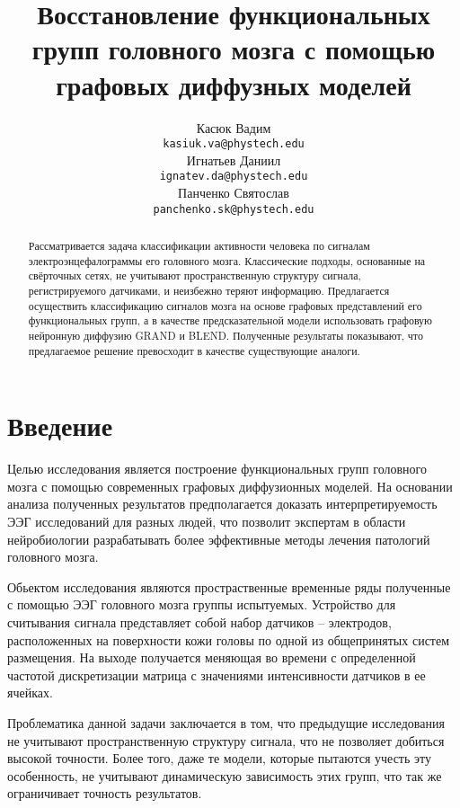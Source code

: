 \documentclass{article}
\title{Восстановление функциональных групп головного мозга с помощью графовых диффузных моделей}
\author{
	Касюк Вадим \\
	\texttt{kasiuk.va@phystech.edu} \\
	\And
	Игнатьев Даниил \\
	\texttt{ignatev.da@phystech.edu} \\
	\And
	Панченко Святослав \\
	\texttt{panchenko.sk@phystech.edu}
}
\date{}
\begin{document}
\maketitle

\begin{abstract}
Рассматривается задача классификации активности человека по сигналам электроэнцефалограммы его головного мозга. Классические подходы, основанные на свёрточных сетях, не учитывают пространственную структуру сигнала, регистрируемого датчиками, и неизбежно теряют информацию. Предлагается осуществить классификацию сигналов мозга на основе графовых представлений его функциональных групп, а в качестве предсказательной модели использовать графовую нейронную диффузию GRAND и BLEND. Полученные результаты показывают, что предлагаемое решение превосходит в качестве существующие аналоги.

\end{abstract}



\section{Введение}

Целью исследования является построение функциональных групп головного мозга с помощью современных графовых диффузионных моделей\cite{wang2019dynamic}. На основании анализа полученных результатов предполагается доказать интерпретируемость ЭЭГ исследований для разных людей, что позволит экспертам в области нейробиологии разрабатывать более эффективные методы лечения патологий головного мозга\cite{kober2008functional}.

Обьектом исследования являются простраственные временные ряды полученные с помощью ЭЭГ головного мозга группы испытуемых. Устройство для считывания сигнала представляет собой
набор датчиков – электродов, расположенных на поверхности кожи головы по одной
из общепринятых систем размещения. На выходе получается меняющая во времени с определенной частотой дискретизации матрица с значениями интенсивности датчиков в ее ячейках.

Проблематика данной задачи заключается в том, что предыдущие исследования \cite{gcnsnet2020, Hou_2020, LI2023833} не учитывают пространственную структуру сигнала, что не позволяет добиться высокой точности. Более того, даже те модели\cite{gcnsnet2020, chamberlain2021blend, varenik2022}, которые пытаются учесть эту особенность, не учитывают динамическую зависимость этих групп, что так же ограничивает точность результатов.
\end{document}
